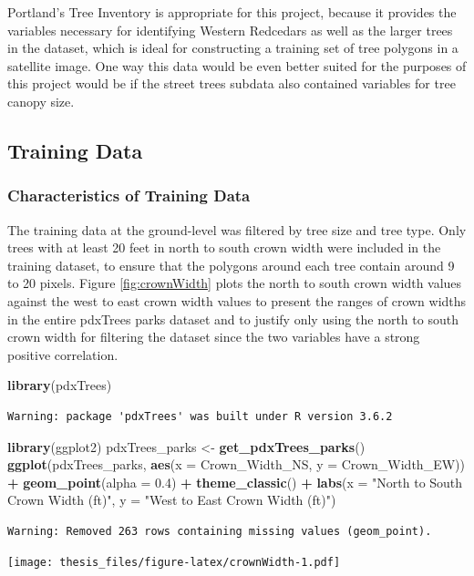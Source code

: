 \documentclass[12pt,twoside]{reedthesis}
\newenvironment{Shaded}{\begin{snugshade}}{\end{snugshade}}
\newcommand{\DataTypeTok}[1]{\textcolor[rgb]{0.13,0.29,0.53}{#1}}
\newcommand{\FloatTok}[1]{\textcolor[rgb]{0.00,0.00,0.81}{#1}}
\newcommand{\KeywordTok}[1]{\textcolor[rgb]{0.13,0.29,0.53}{\textbf{#1}}}
\newcommand{\NormalTok}[1]{#1}
\newcommand{\OperatorTok}[1]{\textcolor[rgb]{0.81,0.36,0.00}{\textbf{#1}}}
\newcommand{\StringTok}[1]{\textcolor[rgb]{0.31,0.60,0.02}{#1}}
\begin{document}
Portland's Tree Inventory is appropriate for this project, because it provides the variables necessary for identifying Western Redcedars as well as the larger trees in the dataset, which is ideal for constructing a training set of tree polygons in a satellite image. One way this data would be even better suited for the purposes of this project would be if the street trees subdata also contained variables for tree canopy size.

\hypertarget{training-data}{%
\subsection{Training Data}\label{training-data}}

\hypertarget{characteristics-of-training-data}{%
\subsubsection{Characteristics of Training Data}\label{characteristics-of-training-data}}

The training data at the ground-level was filtered by tree size and tree type. Only trees with at least 20 feet in north to south crown width were included in the training dataset, to ensure that the polygons around each tree contain around 9 to 20 pixels. Figure \ref{fig:crownWidth} plots the north to south crown width values against the west to east crown width values to present the ranges of crown widths in the entire pdxTrees parks dataset and to justify only using the north to south crown width for filtering the dataset since the two variables have a strong positive correlation.
\begin{Shaded}
\begin{Highlighting}[]
\KeywordTok{library}\NormalTok{(pdxTrees)}
\end{Highlighting}
\end{Shaded}
\begin{verbatim}
Warning: package 'pdxTrees' was built under R version 3.6.2
\end{verbatim}
\begin{Shaded}
\begin{Highlighting}[]
\KeywordTok{library}\NormalTok{(ggplot2)}
\NormalTok{pdxTrees_parks <-}\StringTok{ }\KeywordTok{get_pdxTrees_parks}\NormalTok{()}
\KeywordTok{ggplot}\NormalTok{(pdxTrees_parks, }\KeywordTok{aes}\NormalTok{(}\DataTypeTok{x =}\NormalTok{ Crown_Width_NS, }\DataTypeTok{y =}\NormalTok{ Crown_Width_EW)) }\OperatorTok{+}
\StringTok{  }\KeywordTok{geom_point}\NormalTok{(}\DataTypeTok{alpha =} \FloatTok{0.4}\NormalTok{) }\OperatorTok{+}
\StringTok{  }\KeywordTok{theme_classic}\NormalTok{() }\OperatorTok{+}\StringTok{ }\KeywordTok{labs}\NormalTok{(}\DataTypeTok{x =} \StringTok{"North to South Crown Width (ft)"}\NormalTok{, }\DataTypeTok{y =} \StringTok{"West to East Crown Width (ft)"}\NormalTok{)}
\end{Highlighting}
\end{Shaded}
\begin{verbatim}
Warning: Removed 263 rows containing missing values (geom_point).
\end{verbatim}
\texttt{[image: thesis\_files/figure-latex/crownWidth-1.pdf]}
\end{document}

